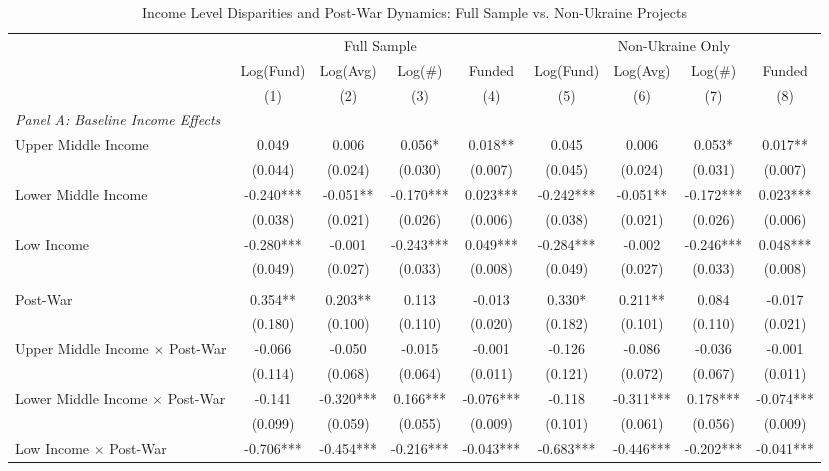 \begin{table}[htbp]
\centering
\caption{Income Level Disparities and Post-War Dynamics: Full Sample vs. Non-Ukraine Projects}
\label{tab:income_war}
\begin{threeparttable}
\small
\begin{tabular}{lcccccccc}
\toprule
& \multicolumn{4}{c}{Full Sample} & \multicolumn{4}{c}{Non-Ukraine Only} \\
\cmidrule(lr){2-5} \cmidrule(lr){6-9}
& Log(Fund) & Log(Avg) & Log(\#) & Funded & Log(Fund) & Log(Avg) & Log(\#) & Funded \\
& (1) & (2) & (3) & (4) & (5) & (6) & (7) & (8) \\
\midrule
\multicolumn{9}{l}{\textit{Panel A: Baseline Income Effects}} \\
Upper Middle Income & 0.049 & 0.006 & 0.056* & 0.018** & 0.045 & 0.006 & 0.053* & 0.017** \\
& (0.044) & (0.024) & (0.030) & (0.007) & (0.045) & (0.024) & (0.031) & (0.007) \\
Lower Middle Income & -0.240*** & -0.051** & -0.170*** & 0.023*** & -0.242*** & -0.051** & -0.172*** & 0.023*** \\
& (0.038) & (0.021) & (0.026) & (0.006) & (0.038) & (0.021) & (0.026) & (0.006) \\
Low Income & -0.280*** & -0.001 & -0.243*** & 0.049*** & -0.284*** & -0.002 & -0.246*** & 0.048*** \\
& (0.049) & (0.027) & (0.033) & (0.008) & (0.049) & (0.027) & (0.033) & (0.008) \\
\addlinespace
\multicolumn{9}{l}{\textit{Panel B: Post-War Interactions}} \\
Post-War & 0.354** & 0.203** & 0.113 & -0.013 & 0.330* & 0.211** & 0.084 & -0.017 \\
 & (0.180) & (0.100) & (0.110) & (0.020) & (0.182) & (0.101) & (0.110) & (0.021) \\
Upper Middle Income $\times$ Post-War & -0.066 & -0.050 & -0.015 & -0.001 & -0.126 & -0.086 & -0.036 & -0.001 \\
 & (0.114) & (0.068) & (0.064) & (0.011) & (0.121) & (0.072) & (0.067) & (0.011) \\
Lower Middle Income $\times$ Post-War & -0.141 & -0.320*** & 0.166*** & -0.076*** & -0.118 & -0.311*** & 0.178*** & -0.074*** \\
 & (0.099) & (0.059) & (0.055) & (0.009) & (0.101) & (0.061) & (0.056) & (0.009) \\
Low Income $\times$ Post-War & -0.706*** & -0.454*** & -0.216*** & -0.043*** & -0.683*** & -0.446*** & -0.202*** & -0.041*** \\

\end{tabular}
\end{threeparttable}
\end{table}
